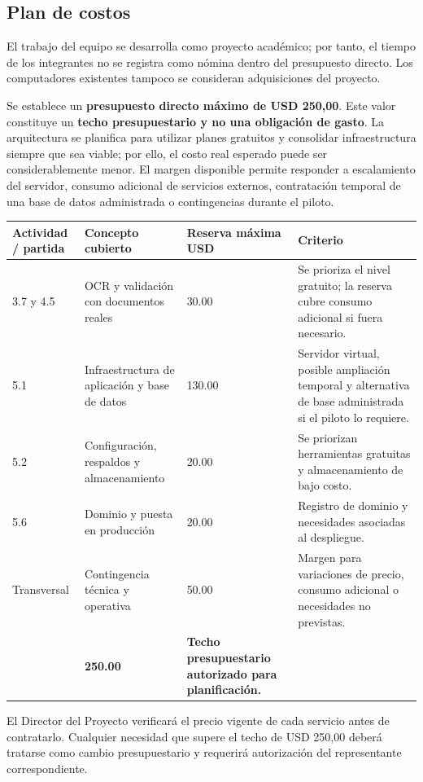 \documentclass[12pt,a4paper]{article}
\begin{document}
\begin{landscape}
\subsection{Plan de costos}

El trabajo del equipo se desarrolla como proyecto académico; por tanto, el tiempo de los integrantes no se registra como nómina dentro del presupuesto directo. Los computadores existentes tampoco se consideran adquisiciones del proyecto.

Se establece un \textbf{presupuesto directo máximo de USD 250,00}. Este valor constituye un \textbf{techo presupuestario y no una obligación de gasto}. La arquitectura se planifica para utilizar planes gratuitos y consolidar infraestructura siempre que sea viable; por ello, el costo real esperado puede ser considerablemente menor. El margen disponible permite responder a escalamiento del servidor, consumo adicional de servicios externos, contratación temporal de una base de datos administrada o contingencias durante el piloto.

\begin{center}
\setlength{\tabcolsep}{4pt}
\renewcommand{\arraystretch}{1.18}
\small
\begin{tabular}{|p{3.2cm}|p{7.0cm}|p{3.0cm}|p{8.8cm}|}
\hline
\rowcolor{tableheader}
\textbf{Actividad / partida} & \textbf{Concepto cubierto} & \textbf{Reserva máxima USD} & \textbf{Criterio} \\ \hline
3.7 y 4.5 & OCR y validación con documentos reales & 30.00 & Se prioriza el nivel gratuito; la reserva cubre consumo adicional si fuera necesario. \\ \hline
5.1 & Infraestructura de aplicación y base de datos & 130.00 & Servidor virtual, posible ampliación temporal y alternativa de base administrada si el piloto lo requiere. \\ \hline
5.2 & Configuración, respaldos y almacenamiento & 20.00 & Se priorizan herramientas gratuitas y almacenamiento de bajo costo. \\ \hline
5.6 & Dominio y puesta en producción & 20.00 & Registro de dominio y necesidades asociadas al despliegue. \\ \hline
Transversal & Contingencia técnica y operativa & 50.00 & Margen para variaciones de precio, consumo adicional o necesidades no previstas. \\ \hline
\rowcolor{headergray}
\multicolumn{2}{|l|}{\textbf{PRESUPUESTO DIRECTO MÁXIMO DEL PROYECTO}} & \textbf{250.00} & \textbf{Techo presupuestario autorizado para planificación.} \\ \hline
\end{tabular}
\end{center}

El Director del Proyecto verificará el precio vigente de cada servicio antes de contratarlo. Cualquier necesidad que supere el techo de USD 250,00 deberá tratarse como cambio presupuestario y requerirá autorización del representante correspondiente.
\end{landscape}
\end{document}
